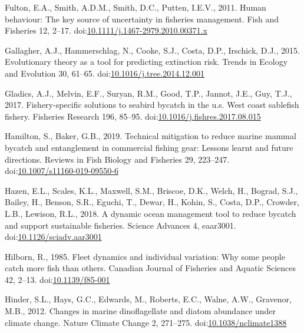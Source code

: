 \documentclass[]{elsarticle} %
\begin{document}
\leavevmode\hypertarget{ref-Fulton2011h}{}%
Fulton, E.A., Smith, A.D.M., Smith, D.C., Putten, I.E.V., 2011. Human
behaviour: The key source of uncertainty in fisheries management. Fish
and Fisheries 12, 2--17.
doi:\href{https://doi.org/10.1111/j.1467-2979.2010.00371.x}{10.1111/j.1467-2979.2010.00371.x}

\leavevmode\hypertarget{ref-Gallagher2015}{}%
Gallagher, A.J., Hammerschlag, N., Cooke, S.J., Costa, D.P., Irschick,
D.J., 2015. Evolutionary theory as a tool for predicting extinction
risk. Trends in Ecology and Evolution 30, 61--65.
doi:\href{https://doi.org/10.1016/j.tree.2014.12.001}{10.1016/j.tree.2014.12.001}

\leavevmode\hypertarget{ref-Gladics2017}{}%
Gladics, A.J., Melvin, E.F., Suryan, R.M., Good, T.P., Jannot, J.E.,
Guy, T.J., 2017. Fishery-specific solutions to seabird bycatch in the
u.s. West coast sablefish fishery. Fisheries Research 196, 85--95.
doi:\href{https://doi.org/10.1016/j.fishres.2017.08.015}{10.1016/j.fishres.2017.08.015}

\leavevmode\hypertarget{ref-Hamilton2019}{}%
Hamilton, S., Baker, G.B., 2019. Technical mitigation to reduce marine
mammal bycatch and entanglement in commercial fishing gear: Lessons
learnt and future directions. Reviews in Fish Biology and Fisheries 29,
223--247.
doi:\href{https://doi.org/10.1007/s11160-019-09550-6}{10.1007/s11160-019-09550-6}

\leavevmode\hypertarget{ref-Kohin2018}{}%
Hazen, E.L., Scales, K.L., Maxwell, S.M., Briscoe, D.K., Welch, H.,
Bograd, S.J., Bailey, H., Benson, S.R., Eguchi, T., Dewar, H., Kohin,
S., Costa, D.P., Crowder, L.B., Lewison, R.L., 2018. A dynamic ocean
management tool to reduce bycatch and support sustainable fisheries.
Science Advances 4, eaar3001.
doi:\href{https://doi.org/10.1126/sciadv.aar3001}{10.1126/sciadv.aar3001}

\leavevmode\hypertarget{ref-Hilborn1985}{}%
Hilborn, R., 1985. Fleet dynamics and individual variation: Why some
people catch more fish than others. Canadian Journal of Fisheries and
Aquatic Sciences 42, 2--13.
doi:\href{https://doi.org/10.1139/f85-001}{10.1139/f85-001}

\leavevmode\hypertarget{ref-Hinder2012}{}%
Hinder, S.L., Hays, G.C., Edwards, M., Roberts, E.C., Walne, A.W.,
Gravenor, M.B., 2012. Changes in marine dinoflagellate and diatom
abundance under climate change. Nature Climate Change 2, 271--275.
doi:\href{https://doi.org/10.1038/nclimate1388}{10.1038/nclimate1388}
\end{document}
